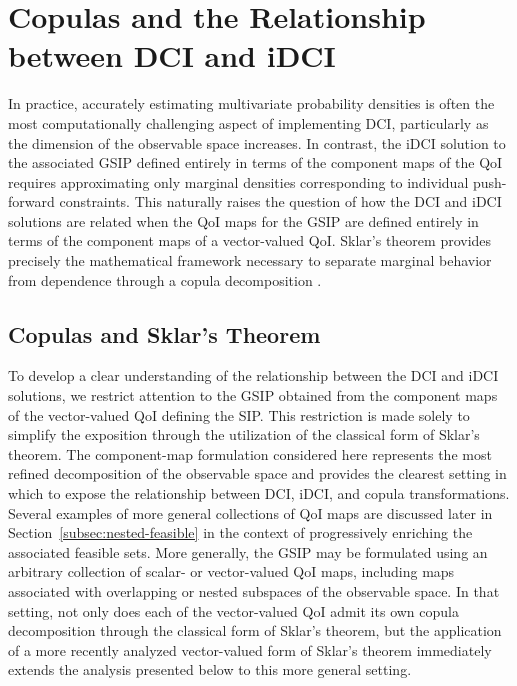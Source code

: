 \documentclass{article}
\newcounter{example}[section]
\begin{document}
\section{Copulas and the Relationship between DCI and iDCI}\label{sec:copulas}

In practice, accurately estimating multivariate probability densities is often the most computationally challenging aspect of implementing DCI, particularly as the dimension of the observable space increases.
In contrast, the iDCI solution to the associated GSIP defined entirely in terms of the component maps of the QoI requires approximating  only marginal densities corresponding to individual push-forward constraints.
This naturally raises the question of how the DCI and iDCI solutions are related when the QoI maps for the GSIP are defined entirely in terms of the component maps of a vector-valued QoI.
Sklar's theorem provides precisely the mathematical framework necessary to separate marginal behavior from dependence through a copula decomposition \cite{Nelsen2006_copulas}.

\subsection{Copulas and Sklar's Theorem}\label{subsec:Sklar}

To develop a clear understanding of the relationship between the DCI and iDCI solutions, we restrict attention to the GSIP obtained from the component maps of the vector-valued QoI defining the SIP.
This restriction is made solely to simplify the exposition through the utilization of the classical form of Sklar's theorem.
The component-map formulation considered here represents the most refined decomposition of the observable space and provides the clearest setting in which to expose the relationship between DCI, iDCI, and copula transformations.
Several examples of more general collections of QoI maps are discussed later in Section~\ref{subsec:nested-feasible} in the context of progressively enriching the associated feasible sets.
More generally, the GSIP may be formulated using an arbitrary collection of scalar- or vector-valued QoI maps, including maps associated with overlapping or nested subspaces of the observable space.
In that setting, not only does each of the vector-valued QoI admit its own copula decomposition through the classical form of Sklar's theorem, but the application of a more recently analyzed vector-valued form of Sklar's theorem \cite{FH23_VectorCopulas} immediately extends the analysis presented below to this more general setting.
\end{document}
